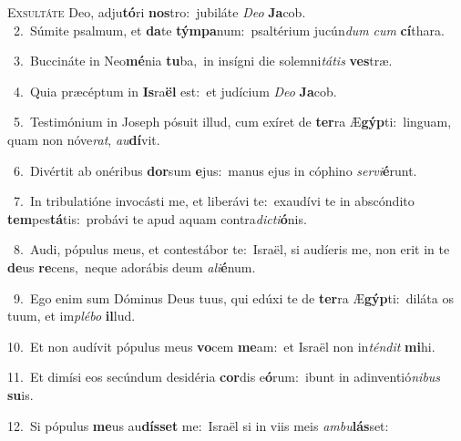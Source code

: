 \lettrine{\initial\textcolor{\initialcolor}{E}}{xsultáte} Deo, adju\-\textbf{tó}\-ri \textbf{nos}\-tro:~\star jubiláte \textit{De}\-\textit{o} \textbf{Ja}\-cob.\\
{\numbfont\textcolor{\numbcolor}{~2.}}~Súmite psalmum, et \textbf{da}\-te \textbf{tým}\-\textbf{pa}num:~\star psaltérium jucún\textit{dum} \textit{cum} \textbf{cí}\-thara.\par
{\numbfont\textcolor{\numbcolor}{~3.}}~Buccináte in Neo\-\textbf{mé}\-nia \textbf{tu}\-ba,~\star in insígni die solemni\-\textit{tá}\-\textit{tis} \textbf{ves}\-træ.\par
{\numbfont\textcolor{\numbcolor}{~4.}}~Quia præcéptum in \textbf{Is}\-ra\textbf{ël} est:~\star et judícium \textit{De}\-\textit{o} \textbf{Ja}\-cob.\par
{\numbfont\textcolor{\numbcolor}{~5.}}~Testimónium in Joseph pósuit illud, cum exíret de \textbf{ter}\-ra Æ\-\textbf{gýp}\-ti:~\star linguam, quam non nóve\-\textit{rat}\-, \textit{au}\-\textbf{dí}vit.\par
{\numbfont\textcolor{\numbcolor}{~6.}}~Divértit ab onéribus \textbf{dor}\-sum \textbf{e}\-jus:~\star manus ejus in cóphino \textit{ser}\-\textit{vi}\textbf{é}runt.\par
{\numbfont\textcolor{\numbcolor}{~7.}}~In tribulatióne invocásti me, et liberávi te:~\dagger exaudívi te in abscóndito \textbf{tem}\-pes\-\textbf{tá}\-tis:~\star probávi te apud aquam contra\-\textit{dic}\-\textit{ti}\textbf{ó}nis.\par
{\numbfont\textcolor{\numbcolor}{~8.}}~Audi, pópulus meus, et contestábor te:~\dagger Israël, si audíeris me, non erit in te \textbf{de}\-us \textbf{re}\-cens,~\star neque adorábis deum \textit{a}\-\textit{li}\textbf{é}num.\par
{\numbfont\textcolor{\numbcolor}{~9.}}~Ego enim sum Dóminus Deus tuus, qui edúxi te de \textbf{ter}\-ra Æ\-\textbf{gýp}\-ti:~\star diláta os tuum, et im\-\textit{plé}\-\textit{bo} \textbf{il}\-lud.\par
{\numbfont\textcolor{\numbcolor}{10.}}~Et non audívit pópulus meus \textbf{vo}\-cem \textbf{me}\-am:~\star et Israël non in\-\textit{tén}\-\textit{dit} \textbf{mi}\-hi.\par
{\numbfont\textcolor{\numbcolor}{11.}}~Et dimísi eos secúndum desidéria \textbf{cor}\-dis e\-\textbf{ó}\-rum:~\star ibunt in adinventió\-\textit{ni}\-\textit{bus} \textbf{su}\-is.\par
{\numbfont\textcolor{\numbcolor}{12.}}~Si pópulus \textbf{me}\-us au\-\textbf{dís}\-\textbf{set} me:~\star Israël si in viis meis \textit{am}\-\textit{bu}\textbf{lás}set:\par
